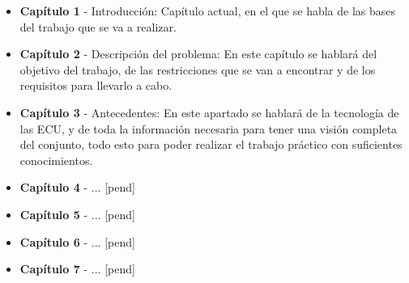 \begin{itemize}
    \item \textbf{Capítulo 1} - Introducción: Capítulo actual, en el que se habla de las bases del trabajo que se va a realizar.
    \item \textbf{Capítulo 2} - Descripción del problema: En este capítulo se hablará del objetivo del trabajo, de las restricciones que se van a encontrar y de los requisitos para llevarlo a cabo.
    \item \textbf{Capítulo 3} - Antecedentes: En este apartado se hablará de la tecnología de las ECU, y de toda la información necesaria para tener una visión completa del conjunto, todo esto para poder realizar el trabajo práctico con suficientes conocimientos.
    \item \textbf{Capítulo 4} - ... [pend]
    \item \textbf{Capítulo 5} - ... [pend]
    \item \textbf{Capítulo 6} - ... [pend]
    \item \textbf{Capítulo 7} - ... [pend]
\end{itemize}
